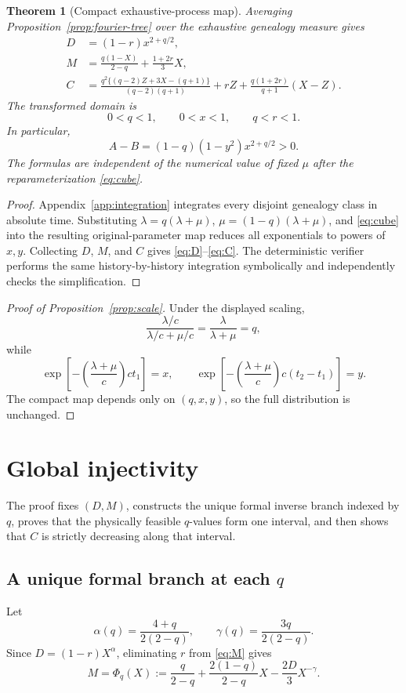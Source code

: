 \documentclass[11pt]{article}
\newtheorem{theorem}{Theorem}[section]
\begin{document}
\begin{theorem}[Compact exhaustive-process map]\label{thm:compact}
Averaging Proposition~\ref{prop:fourier-tree} over the exhaustive genealogy measure gives
\begin{align}
D&=(1-r)x^{2+q/2},\label{eq:D}\\
M&=\frac{q(1-X)}{2-q}+\frac{1+2r}{3}X,\label{eq:M}\\
C&=\frac{q^2\{(q-2)Z+3X-(q+1)\}}{(q-2)(q+1)}
+rZ+\frac{q(1+2r)}{q+1}(X-Z).\label{eq:C}
\end{align}
The transformed domain is
\[
0<q<1,\qquad 0<x<1,\qquad q<r<1.
\]
In particular,
\begin{equation}\label{eq:Dpositive}
A-B=(1-q)(1-y^2)x^{2+q/2}>0.
\end{equation}
The formulas are independent of the numerical value of fixed $\mu$ after the reparameterization \eqref{eq:cube}.
\end{theorem}
\begin{proof}
Appendix~\ref{app:integration} integrates every disjoint genealogy class in absolute time.  Substituting $\lambda=q(\lambda+\mu)$, $\mu=(1-q)(\lambda+\mu)$, and \eqref{eq:cube} into the resulting original-parameter map reduces all exponentials to powers of $x,y$.  Collecting $D$, $M$, and $C$ gives \eqref{eq:D}--\eqref{eq:C}.  The deterministic verifier performs the same history-by-history integration symbolically and independently checks the simplification.
\end{proof}

\begin{proof}[Proof of Proposition~\ref{prop:scale}]
Under the displayed scaling,
\[
\frac{\lambda/c}{\lambda/c+\mu/c}=\frac{\lambda}{\lambda+\mu}=q,
\]
while
\[
\exp\!\left[-\left(\frac{\lambda+\mu}{c}\right)ct_1\right]=x,
\qquad
\exp\!\left[-\left(\frac{\lambda+\mu}{c}\right)c(t_2-t_1)\right]=y.
\]
The compact map depends only on $(q,x,y)$, so the full distribution is unchanged.
\end{proof}

\section{Global injectivity}\label{sec:global}

The proof fixes $(D,M)$, constructs the unique formal inverse branch indexed by $q$, proves that the physically feasible $q$-values form one interval, and then shows that $C$ is strictly decreasing along that interval.

\subsection{A unique formal branch at each \texorpdfstring{$q$}{q}}
Let
\[
\alpha(q)=\frac{4+q}{2(2-q)},
\qquad
\gamma(q)=\frac{3q}{2(2-q)}.
\]
Since $D=(1-r)X^\alpha$, eliminating $r$ from \eqref{eq:M} gives
\begin{equation}\label{eq:Phi}
M=\Phi_q(X):=
\frac{q}{2-q}+\frac{2(1-q)}{2-q}X
-\frac{2D}{3}X^{-\gamma}.
\end{equation}
\end{document}
